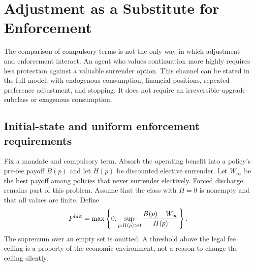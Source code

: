 \section{Adjustment as a Substitute for Enforcement}
\label{sec:enforcementfrontier}
The comparison of compulsory terms is not the only way in which adjustment and enforcement interact. An agent who values continuation more highly requires less protection against a valuable surrender option. This channel can be stated in the full model, with endogenous consumption, financial positions, repeated preference adjustment, and stopping. It does not require an irreversible-upgrade subclass or exogenous consumption.

\subsection{Initial-state and uniform enforcement requirements}
Fix a mandate and compulsory term. Absorb the operating benefit into a policy's pre-fee payoff $B(p)$ and let $H(p)$ be discounted elective surrender. Let $W_\infty$ be the best payoff among policies that never surrender electively. Forced discharge remains part of this problem. Assume that the class with $H=0$ is nonempty and that all values are finite. Define
\begin{equation}
 F^{\rm init}=\max\left\{0,\sup_{p:H(p)>0}
                   \frac{B(p)-W_\infty}{H(p)}\right\}.
 \label{eq:initialthreshold}
\end{equation}
The supremum over an empty set is omitted. A threshold above the legal fee ceiling is a property of the economic environment, not a reason to change the ceiling silently.


